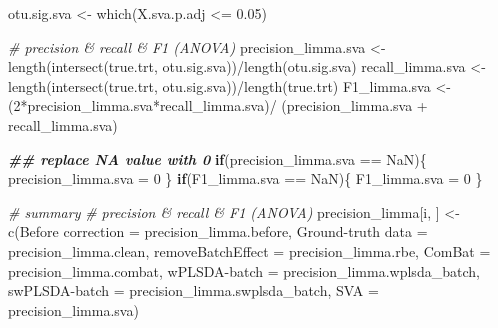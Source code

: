 \documentclass[
]{book}
\newenvironment{Shaded}{\begin{snugshade}}{\end{snugshade}}
\newcommand{\AttributeTok}[1]{\textcolor[rgb]{0.77,0.63,0.00}{#1}}
\newcommand{\CommentTok}[1]{\textcolor[rgb]{0.56,0.35,0.01}{\textit{#1}}}
\newcommand{\ControlFlowTok}[1]{\textcolor[rgb]{0.13,0.29,0.53}{\textbf{#1}}}
\newcommand{\DecValTok}[1]{\textcolor[rgb]{0.00,0.00,0.81}{#1}}
\newcommand{\DocumentationTok}[1]{\textcolor[rgb]{0.56,0.35,0.01}{\textbf{\textit{#1}}}}
\newcommand{\FloatTok}[1]{\textcolor[rgb]{0.00,0.00,0.81}{#1}}
\newcommand{\FunctionTok}[1]{\textcolor[rgb]{0.00,0.00,0.00}{#1}}
\newcommand{\NormalTok}[1]{#1}
\newcommand{\OtherTok}[1]{\textcolor[rgb]{0.56,0.35,0.01}{#1}}
\newcommand{\SpecialCharTok}[1]{\textcolor[rgb]{0.00,0.00,0.00}{#1}}
\newcommand{\StringTok}[1]{\textcolor[rgb]{0.31,0.60,0.02}{#1}}
\begin{document}
\begin{Shaded}
\begin{Highlighting}[]
\NormalTok{  otu.sig.sva }\OtherTok{\textless{}{-}} \FunctionTok{which}\NormalTok{(X.sva.p.adj }\SpecialCharTok{\textless{}=} \FloatTok{0.05}\NormalTok{)}
  
  \CommentTok{\# precision \& recall \& F1 (ANOVA)}
\NormalTok{  precision\_limma.sva }\OtherTok{\textless{}{-}} 
    \FunctionTok{length}\NormalTok{(}\FunctionTok{intersect}\NormalTok{(true.trt, otu.sig.sva))}\SpecialCharTok{/}\FunctionTok{length}\NormalTok{(otu.sig.sva)}
\NormalTok{  recall\_limma.sva }\OtherTok{\textless{}{-}} 
    \FunctionTok{length}\NormalTok{(}\FunctionTok{intersect}\NormalTok{(true.trt, otu.sig.sva))}\SpecialCharTok{/}\FunctionTok{length}\NormalTok{(true.trt)}
\NormalTok{  F1\_limma.sva }\OtherTok{\textless{}{-}} 
\NormalTok{    (}\DecValTok{2}\SpecialCharTok{*}\NormalTok{precision\_limma.sva}\SpecialCharTok{*}\NormalTok{recall\_limma.sva)}\SpecialCharTok{/}
\NormalTok{    (precision\_limma.sva }\SpecialCharTok{+}\NormalTok{ recall\_limma.sva)}
  
  \DocumentationTok{\#\# replace NA value with 0}
  \ControlFlowTok{if}\NormalTok{(precision\_limma.sva }\SpecialCharTok{==} \StringTok{\textquotesingle{}NaN\textquotesingle{}}\NormalTok{)\{}
\NormalTok{    precision\_limma.sva }\OtherTok{=} \DecValTok{0}
\NormalTok{  \}}
  \ControlFlowTok{if}\NormalTok{(F1\_limma.sva }\SpecialCharTok{==} \StringTok{\textquotesingle{}NaN\textquotesingle{}}\NormalTok{)\{}
\NormalTok{    F1\_limma.sva }\OtherTok{=} \DecValTok{0}
\NormalTok{  \}}
  
  
  \CommentTok{\# summary}
  \CommentTok{\# precision \& recall \& F1 (ANOVA)}
\NormalTok{  precision\_limma[i, ] }\OtherTok{\textless{}{-}} \FunctionTok{c}\NormalTok{(}\StringTok{\textasciigrave{}}\AttributeTok{Before correction}\StringTok{\textasciigrave{}} \OtherTok{=}\NormalTok{ precision\_limma.before, }
                            \StringTok{\textasciigrave{}}\AttributeTok{Ground{-}truth data}\StringTok{\textasciigrave{}} \OtherTok{=}\NormalTok{ precision\_limma.clean,}
                            \StringTok{\textasciigrave{}}\AttributeTok{removeBatchEffect}\StringTok{\textasciigrave{}} \OtherTok{=}\NormalTok{ precision\_limma.rbe,}
                            \AttributeTok{ComBat =}\NormalTok{ precision\_limma.combat,}
                            \StringTok{\textasciigrave{}}\AttributeTok{wPLSDA{-}batch}\StringTok{\textasciigrave{}} \OtherTok{=}\NormalTok{ precision\_limma.wplsda\_batch,}
                            \StringTok{\textasciigrave{}}\AttributeTok{swPLSDA{-}batch}\StringTok{\textasciigrave{}} \OtherTok{=}\NormalTok{ precision\_limma.swplsda\_batch,}
                            \AttributeTok{SVA =}\NormalTok{ precision\_limma.sva)}
  

\end{Highlighting}
\end{Shaded}
\end{document}
